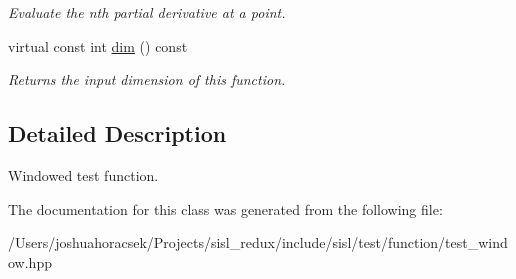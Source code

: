 \begin{DoxyCompactItemize}
\begin{DoxyCompactList}\small\item\em Evaluate the n\textquotesingle{}th partial derivative at a point. \end{DoxyCompactList}\item 
\mbox{\label{classsisl_1_1test_1_1test__window_ae9d16844d527e716838085ab436d1f06}} 
virtual const int \hyperlink{classsisl_1_1test_1_1test__window_ae9d16844d527e716838085ab436d1f06}{dim} () const
\begin{DoxyCompactList}\small\item\em Returns the input dimension of this function. \end{DoxyCompactList}\end{DoxyCompactItemize}


\subsection{Detailed Description}
Windowed test function. 

The documentation for this class was generated from the following file\+:\begin{DoxyCompactItemize}
\item 
/\+Users/joshuahoracsek/\+Projects/sisl\+\_\+redux/include/sisl/test/function/test\+\_\+window.\+hpp\end{DoxyCompactItemize}
